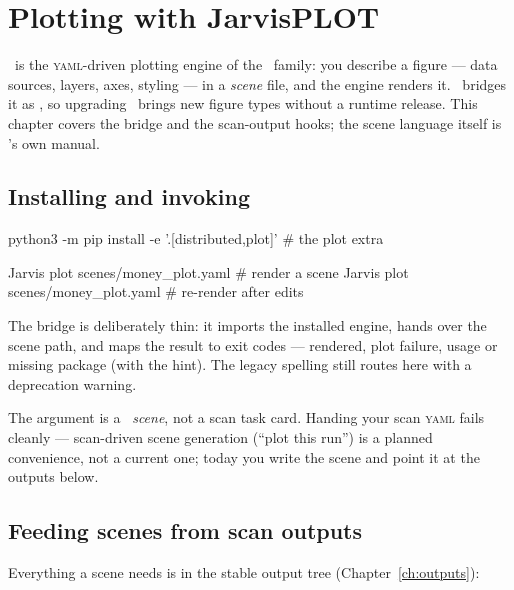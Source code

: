 \chapter{Plotting with JarvisPLOT}
\label{ch:jarvisplot}

 \JPlot\ is the \textsc{yaml}-driven
plotting engine of the \Jarvis\ family: you describe a figure --- data sources, layers,
axes, styling --- in a \emph{scene} file, and the engine renders it. \Jtwo\ bridges it
as , so upgrading \JPlot\ brings new figure types without a runtime
release. This chapter covers the bridge and the scan-output hooks; the scene language
itself is \JPlot's own manual.

\section{Installing and invoking}
\label{sec:plot-install}

\begin{terminal}
\begin{jcmd}
python3 -m pip install -e '.[distributed,plot]'   # the plot extra

Jarvis plot scenes/money_plot.yaml               # render a scene
Jarvis plot scenes/money_plot.yaml               # re-render after edits
\end{jcmd}
\end{terminal}

The bridge is deliberately thin: it imports the installed engine, hands over the scene
path, and maps the result to exit codes ---  rendered,  plot failure,
 usage or missing package (with the  hint). The legacy
spelling  still routes here with a deprecation
warning.

\begin{jwarn}
The argument is a \JPlot\ \emph{scene}, not a scan task card. Handing  your
scan \textsc{yaml} fails cleanly --- scan-driven scene generation (``plot this run'')
is a planned convenience, not a current one; today you write the scene and point it at
the outputs below.
\end{jwarn}

\section{Feeding scenes from scan outputs}
\label{sec:plot-data}

Everything a scene needs is in the stable output tree (Chapter~\ref{ch:outputs}):

